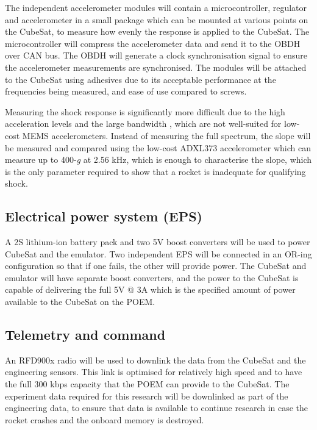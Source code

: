 \documentclass[a4paper,11pt]{article}
\begin{document}
The independent accelerometer modules will contain a microcontroller, regulator and accelerometer in a small package which can be mounted at various points on the CubeSat, to measure how evenly the response is applied to the CubeSat. The microcontroller will compress the accelerometer data and send it to the OBDH over CAN bus. The OBDH will generate a clock synchronisation signal to ensure the accelerometer measurements are synchronised. The modules will be attached to the CubeSat using adhesives due to its acceptable performance at the frequencies being measured, and ease of use compared to screws.

Measuring the shock response is significantly more difficult due to the high acceleration levels and the large bandwidth \cite{nasa-pyroshock}, which are not well-suited for low-cost MEMS accelerometers. Instead of measuring the full spectrum, the slope will be measured and compared using the low-cost ADXL373 accelerometer which can measure up to 400-\textit{g} at 2.56 kHz, which is enough to characterise the slope, which is the only parameter required to show that a rocket is inadequate for qualifying shock.


\subsection{Electrical power system (EPS)}
A 2S lithium-ion battery pack and two 5V boost converters will be used to power CubeSat and the emulator. Two independent EPS will be connected in an OR-ing configuration so that if one fails, the other will provide power. The CubeSat and emulator will have separate boost converters, and the power to the CubeSat is capable of delivering the full 5V @ 3A which is the specified amount of power available to the CubeSat on the POEM.

\subsection{Telemetry and command}
An RFD900x radio will be used to downlink the data from the CubeSat and the engineering sensors. This link is optimised for relatively high speed and to have the full 300 kbps capacity that the POEM can provide to the CubeSat. The experiment data required for this research will be downlinked as part of the engineering data, to ensure that data is available to continue research in case the rocket crashes and the onboard memory is destroyed.
\end{document}
